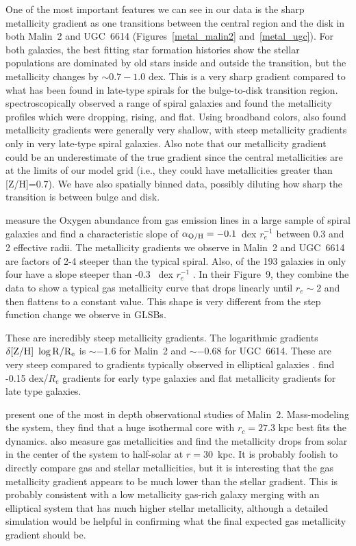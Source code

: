\documentclass[12pt,preprint]{aastex}
\begin{document}
One of the most important features we can see in our data is the sharp metallicity gradient as one transitions between the central region and the disk in both Malin~2 and UGC~6614 (Figures~\ref{metal_malin2} and~\ref{metal_ugc}).
For both galaxies, the best fitting star formation histories show the stellar populations are dominated by old stars inside and outside the transition, but the metallicity changes by $\sim0.7-1.0$ dex.
This is a very sharp gradient compared to what has been found in late-type spirals for the bulge-to-disk transition region.
\citet{MacArthur09} spectroscopically observed a range of spiral galaxies and found the metallicity profiles which were dropping, rising, and flat.
Using broadband colors, \citet{MacArthur04} also found metallicity gradients were generally very shallow, with steep metallicity gradients only in very late-type spiral galaxies. Also note that our metallicity gradient could be an underestimate of the true gradient since the central metallicities are at the limits of our model grid (i.e., they could have metallicities greater than [Z/H]=0.7). We have also spatially binned data, possibly diluting how sharp the transition is between bulge and disk.

\citet{Sanchez14} measure the Oxygen abundance from gas emission lines in a large sample of spiral galaxies and find a characteristic slope of $\alpha_{\rm{O/H}} = -0.1$\ dex $r_e^{-1}$ between 0.3 and 2 effective radii.
The metallicity gradients we observe in Malin~2 and UGC~6614 are factors of 2-4 steeper than the typical spiral. Also, of the 193 galaxies in \citet{Sanchez14} only four have a slope steeper than -0.3 \ dex $r_e^{-1}$ \citep[Figure~6]{Sanchez14}.
In their Figure~9, they combine the data to show a typical gas metallicity curve that drops linearly until $r_e\sim2$ and then flattens to a constant value.
This shape is very different from the step function change we observe in GLSBs.


These are incredibly steep metallicity gradients.
The logarithmic gradients $\delta \rm{[Z/H]}\ \log{R/R_e}$ is $\sim -1.6$ for Malin~2 and $\sim -0.68$ for UGC~6614.
These are very steep compared to gradients typically observed in elliptical galaxies \citep{Kuntschner10, Greene12, Greene15}.
\citet{Wilkinson15} find -0.15 dex/$R_e$ gradients for early type galaxies and flat metallicity gradients for late type galaxies. 


\citet{Kasparova14} present one of the most in depth observational studies of Malin~2.
Mass-modeling the system, they find that a huge isothermal core with $r_c=27.3$ kpc best fits the dynamics.
\citet{Kasparova14} also measure gas metallicities and find the metallicity drops from solar in the center of the system to half-solar at $r=30$\ kpc.
It is probably foolish to directly compare gas and stellar metallicities, but it is interesting that the gas metallicity gradient appears to be much lower than the stellar gradient.
This is probably consistent with a low metallicity gas-rich galaxy merging with an elliptical system that has much higher stellar metallicity, although a detailed simulation would be helpful in confirming what the final expected gas metallicity gradient should be.
\end{document}
